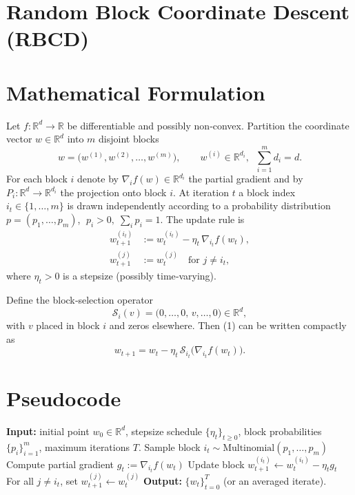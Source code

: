 \documentclass{article}
\begin{document}
\section*{Random Block Coordinate Descent (RBCD)}

\section*{Mathematical Formulation}
Let $f:\mathbb{R}^{d}\rightarrow\mathbb{R}$ be differentiable and possibly non‑convex.  
Partition the coordinate vector $w\in\mathbb{R}^{d}$ into $m$ disjoint blocks
\[
w=\bigl(w^{(1)},w^{(2)},\dots ,w^{(m)}\bigr),\qquad 
w^{(i)}\in\mathbb{R}^{d_i},\;\; \sum_{i=1}^{m}d_i=d .
\]
For each block $i$ denote by $\nabla_i f(w)\in\mathbb{R}^{d_i}$ the partial gradient and by
$P_i:\mathbb{R}^{d}\rightarrow\mathbb{R}^{d_i}$ the projection onto block $i$.
At iteration $t$ a block index $i_t\in\{1,\dots ,m\}$ is drawn independently
according to a probability distribution $p=(p_1,\dots ,p_m)$, $\;p_i>0,\;\sum_i p_i=1$.
The update rule is
\[
\boxed{
\begin{aligned}
w_{t+1}^{(i_t)} &:= w_{t}^{(i_t)}-\eta_t \,\nabla_{i_t} f(w_t),\\
w_{t+1}^{(j)}   &:= w_{t}^{(j)}\quad\text{for }j\neq i_t,
\end{aligned}}
\tag{1}
\]
where $\eta_t>0$ is a stepsize (possibly time‑varying).

Define the block‑selection operator 
\[
\mathcal{S}_{i}(v)=\bigl(0,\dots ,0,\,v,\dots ,0\bigr)\in\mathbb{R}^{d},
\]
with $v$ placed in block $i$ and zeros elsewhere.  Then (1) can be written compactly as
\[
w_{t+1}=w_t-\eta_t\,\mathcal{S}_{i_t}\bigl(\nabla_{i_t} f(w_t)\bigr).
\tag{2}
\]

\section*{Pseudocode}
\begin{algorithm}[H]
\caption{Random Block Coordinate Descent (RBCD)}
\begin{algorithmic}[1]
\State \textbf{Input:} initial point $w_0\in\mathbb{R}^{d}$, stepsize schedule $\{\eta_t\}_{t\ge0}$, block probabilities $\{p_i\}_{i=1}^{m}$, maximum iterations $T$.
    \State Sample block $i_t\sim\text{Multinomial}(p_1,\dots ,p_m)$ \label{line:sample}
    \State Compute partial gradient $g_t:=\nabla_{i_t} f(w_t)$ \label{line:grad}
    \State Update block $w_{t+1}^{(i_t)} \gets w_{t}^{(i_t)}-\eta_t g_t$ \label{line:update}
    \State For all $j\neq i_t$, set $w_{t+1}^{(j)}\gets w_{t}^{(j)}$ \label{line:keep}
\EndFor
\State \textbf{Output:} $\{w_t\}_{t=0}^{T}$ (or an averaged iterate).
\end{algorithmic}
\end{algorithm}
\end{document}
